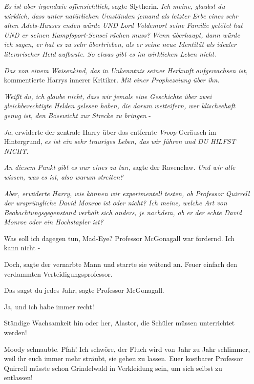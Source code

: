 \emph{Es ist aber irgendwie offensichtlich,} sagte Slytherin. \emph{Ich meine,
glaubst du wirklich, dass unter natürlichen Umständen jemand als letzter Erbe
eines sehr alten Adels-Hauses enden würde UND Lord Voldemort seine Familie
getötet hat UND er seinen Kampfsport-Sensei rächen muss? Wenn überhaupt, dann
würde ich sagen, er hat es zu sehr übertrieben, als er seine neue Identität als
idealer literarischer Held aufbaute. So etwas gibt es im wirklichen Leben nicht.
}

\emph{Das von einem Waisenkind, das in Unkenntnis seiner Herkunft aufgewachsen
ist,} kommentierte Harrys innerer Kritiker. \emph{Mit einer Prophezeiung über
ihn.}

\emph{Weißt du, ich glaube nicht, dass wir jemals eine Geschichte über zwei
gleichberechtigte Helden gelesen haben, die darum wetteifern, wer klischeehaft
genug ist, den Bösewicht zur Strecke zu bringen} -

\emph{Ja}, erwiderte der zentrale Harry über das entfernte \emph{Vroop}-Geräusch
im Hintergrund, \emph{es ist ein sehr trauriges Leben, das wir führen und DU
HILFST NICHT.}

\emph{An diesem Punkt gibt es nur eines zu tun,} sagte der Ravenclaw. \emph{Und
wir alle wissen, was es ist, also warum streiten?}

\emph{Aber, erwiderte Harry, wie können wir experimentell testen, ob Professor
Quirrell der ursprüngliche David Monroe ist oder nicht? Ich meine, welche Art
von Beobachtungsgegenstand verhält sich anders, je nachdem, ob er der echte
David Monroe oder ein Hochstapler ist?}

\glqq{}Was soll ich dagegen tun, Mad-Eye?\grqq{} Professor McGonagall war
fordernd. \glqq{}Ich kann nicht -\grqq{}

\glqq{}Doch\grqq{}, sagte der vernarbte Mann und starrte sie wütend an. \glqq{}
Feuer einfach den verdammten Verteidigungsprofessor.\grqq{}

\glqq{}Das sagst du jedes Jahr\grqq{}, sagte Professor McGonagall.

\glqq{}Ja, und ich habe immer recht!\grqq{}

\glqq{}Ständige Wachsamkeit hin oder her, Alastor, die Schüler müssen
unterrichtet werden!\grqq{}

Moody schnaubte. \glqq{}Pfah! Ich schwöre, der Fluch wird von Jahr zu Jahr
schlimmer, weil ihr euch immer mehr sträubt, sie gehen zu lassen. Euer kostbarer
Professor Quirrell müsste schon Grindelwald in Verkleidung sein, um sich selbst
zu entlassen!\grqq{}

